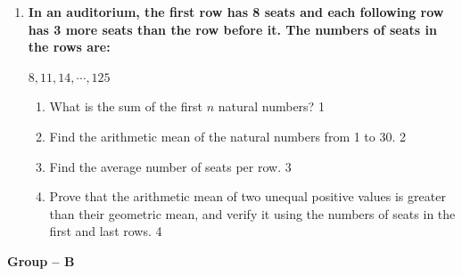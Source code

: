 \documentclass[12pt]{article}
\begin{document}
\begin{enumerate}
\item
\textbf{In an auditorium, the first row has 8 seats and each following row has 3 more seats than the row before it. The numbers of seats in the rows are:}
\begin{center}
$8, 11, 14, \cdots, 125$
\end{center}
\begin{enumerate}
  \item What is the sum of the first $n$ natural numbers? \hfill 1
  \item Find the arithmetic mean of the natural numbers from 1 to 30. \hfill 2
  \item Find the average number of seats per row. \hfill 3
  \item Prove that the arithmetic mean of two unequal positive values is greater than their geometric mean, and verify it using the numbers of seats in the first and last rows. \hfill 4
\end{enumerate}

\end{enumerate}

\newpage

\begin{center}
\textbf{Group -- B}
\end{center}
\end{document}
